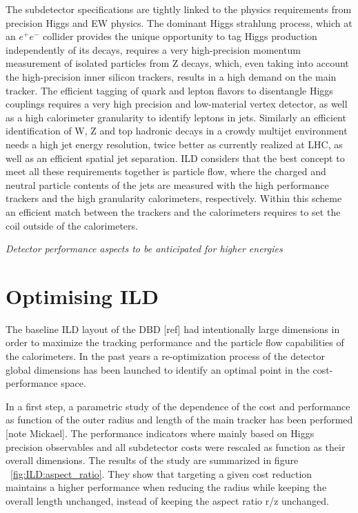 The subdetector specifications are tightly linked to the physics requirements from precision Higgs and EW physics. The dominant Higgs strahlung process, which at an $e^+e^-$ collider provides the unique opportunity to tag Higgs production independently of its decays, requires a very high-precision momentum measurement of isolated particles from Z decays, which, even taking into account the high-precision inner silicon trackers, results in a high demand on the main tracker. The efficient tagging of quark and lepton flavors to disentangle Higgs couplings requires a very high precision and low-material vertex detector, as well as a high calorimeter granularity to identify leptons in jets. Similarly an efficient identification of W, Z and top hadronic decays in a crowdy multijet environment needs a high jet energy resolution, twice better as currently realized at LHC, as well as an efficient spatial jet separation. ILD considers that the best concept to meet all these requirements together is particle flow, where the charged and neutral particle contents of the jets are measured with the high performance trackers and the high granularity calorimeters, respectively. Within this scheme an efficient match between the trackers and the calorimeters requires to set the coil outside of the calorimeters.     

\textit{Detector performance aspects to be anticipated for higher energies}


\section{Optimising ILD}

The baseline ILD layout of the DBD [ref] had intentionally large dimensions in order to maximize the tracking performance and the particle flow capabilities of the calorimeters. In the past years a re-optimization process of the detector global dimensions has been launched to identify an optimal point in the cost-performance space.

In a first step, a parametric study of the dependence of the cost and performance as function of the outer radius and length of the main tracker has been performed [note Mickael]. The performance indicators where mainly based on Higgs precision observables and all subdetector costs were rescaled as function as their overall dimensions. The results of the study are summarized in figure ~\ref{fig:ILD:aspect_ratio}. They show that targeting a given cost reduction maintains a higher performance when reducing the radius while keeping the overall length unchanged, instead of keeping the aspect ratio r/z unchanged.  

